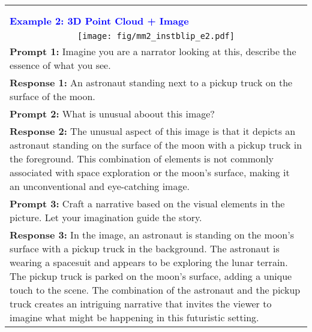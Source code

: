 \documentclass{article}
\newcommand{\methodname}{{\scshape Vit-lens}\xspace}
\begin{document}
\begin{table*}[h!]
\begin{minipage}{1.0\columnwidth}
\begin{tcolorbox}[colback=white,colframe=blue!75!black,title={\bf InstructBLIP w/ \methodname, Two Multimodal Inputs.}]
\begin{tabular}{p{} }
\hrulefill  \\ \\
\textcolor{blue}{ {\bf Example 2: 3D Point Cloud + Image} }  \\
 \multicolumn{1}{c}{\texttt{[image: fig/mm2\_instblip\_e2.pdf]}} \\
{\bf Prompt 1:} Imagine you are a narrator looking at this, describe the essence of what you see.  \\
{\bf Response 1:} An astronaut standing next to a pickup truck on the surface of the moon.  \\
{\bf Prompt 2:} What is unusual aboout this image?  \\
{\bf Response 2:} The unusual aspect of this image is that it depicts an astronaut standing on the surface of the moon with a pickup truck in the foreground. This combination of elements is not commonly associated with space exploration or the moon's surface, making it an unconventional and eye-catching image.  \\
{\bf Prompt 3:} Craft a narrative based on the visual elements in the picture. Let your imagination guide the story. \\
{\bf Response 3:} In the image, an astronaut is standing on the moon's surface with a pickup truck in the background. The astronaut is wearing a spacesuit and appears to be exploring the lunar terrain. The pickup truck is parked on the moon's surface, adding a unique touch to the scene. The combination of the astronaut and the pickup truck creates an intriguing narrative that invites the viewer to imagine what might be happening in this futuristic setting.
\end{tabular}
\end{tcolorbox}
\vspace{-2mm}
\end{minipage}
\end{table*}
\end{document}
